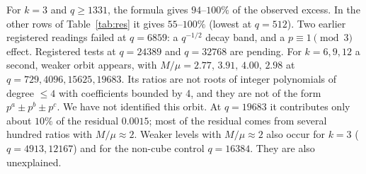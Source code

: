 For $k=3$ and $q\ge1331$, the formula gives $94$--$100\%$ of the observed excess. In the other rows of Table~\ref{tab:res} it gives $55$--$100\%$ (lowest at $q=512$).
Two earlier registered readings failed at $q=6859$: a $q^{-1/2}$ decay band, and a $p\equiv1\pmod3$ effect. Registered tests at $q=24389$ and $q=32768$ are pending.
For $k=6,9,12$ a second, weaker orbit appears, with $M/\mu=2.77,\,3.91,\,4.00,\,2.98$ at $q=729,4096,15625,19683$. Its ratios are not roots of integer
polynomials of degree $\le4$ with coefficients bounded by 4, and they are not of the form $p^a\pm p^b\pm p^c$. We have not identified this orbit.
At $q=19683$ it contributes only about $10\%$ of the residual $0.0015$; most of the residual comes from several hundred ratios with $M/\mu\approx2$.
Weaker levels with $M/\mu\approx2$ also occur for $k=3$ ($q=4913,12167$) and for the non-cube control $q=16384$. They are also unexplained.
